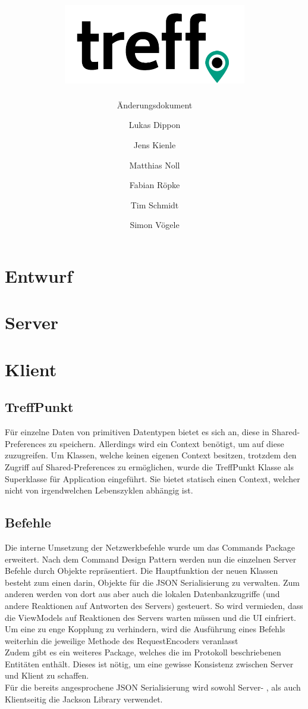 \documentclass[parskip=full,11pt]{scrartcl}
\title{\includegraphics[width = 80mm]{images/logo_crop.png}}
\subtitle{\huge Änderungsdokument}
\author{Lukas Dippon
        \and Jens Kienle
        \and Matthias Noll
        \and Fabian Röpke
        \and Tim Schmidt
        \and Simon Vögele}
\begin{document}
\maketitle
\thispagestyle{empty} %

\pagebreak
\tableofcontents

\pagebreak
\section{Entwurf}



\pagebreak
\section{Server}



\pagebreak
\section{Klient}

\subsection{TreffPunkt}
Für einzelne Daten von primitiven Datentypen bietet es sich an, diese in 
Shared-Preferences zu speichern. Allerdings wird ein Context benötigt, um auf 
diese zuzugreifen. Um Klassen, welche keinen eigenen Context besitzen, trotzdem 
den Zugriff auf Shared-Preferences zu ermöglichen, wurde die TreffPunkt Klasse 
als Superklasse für Application eingeführt. Sie bietet statisch einen Context, 
welcher nicht von irgendwelchen Lebenszyklen abhängig ist.

\subsection{Befehle}
Die interne Umsetzung der Netzwerkbefehle wurde um das Commands Package 
erweitert. Nach dem Command Design Pattern werden nun die einzelnen Server 
Befehle durch Objekte repräsentiert. Die Hauptfunktion der neuen Klassen 
besteht zum einen darin, Objekte für die JSON Serialisierung zu verwalten. Zum 
anderen werden von dort aus aber auch die lokalen Datenbankzugriffe (und 
andere Reaktionen auf Antworten des Servers) gesteuert. So wird vermieden, dass 
die ViewModels auf Reaktionen des Servers warten müssen und die UI einfriert.
Um eine zu enge Kopplung zu verhindern, wird die Ausführung eines Befehls 
weiterhin die jeweilige Methode des RequestEncoders veranlasst\\
Zudem gibt es ein weiteres Package, welches die im Protokoll beschriebenen 
Entitäten enthält. Dieses ist nötig, um eine gewisse Konsistenz zwischen Server 
und Klient zu schaffen.\\
Für die bereits angesprochene JSON Serialisierung wird sowohl Server- , als 
auch Klientseitig die Jackson Library verwendet.
\end{document}
